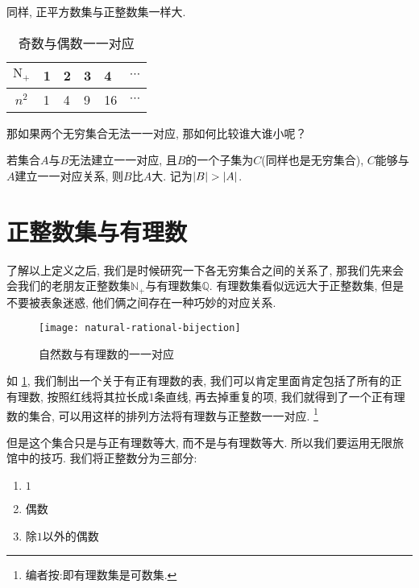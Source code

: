 同样, 正平方数集与正整数集一样大.

\begin{table}[!h]
  \begin{center}
    \begin{tabular}{c|lllll}
      \toprule
      $\mathrm N_+$ & 1 & 2 & 3 & 4  & $\cdots$ \\
      \midrule
      $n^2$         & 1 & 4 & 9 & 16 & $\cdots$ \\
      \bottomrule
    \end{tabular}
    \caption{奇数与偶数一一对应}
  \end{center}
\end{table}

那如果两个无穷集合无法一一对应, 那如何比较谁大谁小呢？

\begin{definition}
  若集合$A$与$B$无法建立一一对应, 且$B$的一个子集为$C$(同样也是无穷集合), $C$能够与$A$建立一一对应关系, 则$B$比$A$大.
  记为$\left\lvert B \right\rvert > \left\lvert A \right\rvert$.
\end{definition}

\section{正整数集与有理数}

了解以上定义之后, 我们是时候研究一下各无穷集合之间的关系了,
那我们先来会会我们的老朋友正整数集$\mathbb N_+$与有理数集$\mathbb Q$.
有理数集看似远远大于正整数集, 但是不要被表象迷惑, 他们俩之间存在一种巧妙的对应关系.

\begin{figure}[htbp]
  \begin{center}
    \texttt{[image: natural-rational-bijection]}
    \caption{自然数与有理数的一一对应}
    \label{fig:bijection}
  \end{center}
\end{figure}

如 \cref{fig:bijection}, 我们制出一个关于有正有理数的表, 我们可以肯定里面肯定包括了所有的正有理数,
按照红线将其拉长成1条直线, 再去掉重复的项,
我们就得到了一个正有理数的集合, 可以用这样的排列方法将有理数与正整数一一对应.
\footnote{编者按:即有理数集是可数集. }

但是这个集合只是与正有理数等大, 而不是与有理数等大.
所以我们要运用无限旅馆中的技巧.
我们将正整数分为三部分:

\begin{enumerate}
  \item \label{enum:1} ${1}$
  \item \label{enum:2} 偶数
  \item \label{enum:3} 除$1$以外的偶数
\end{enumerate}

